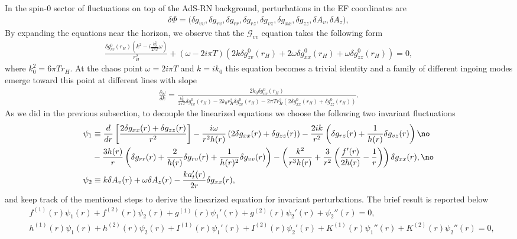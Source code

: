 \documentclass[preprintnumbers,aps,prd,longbibliography,nofootinbib,nobibnotes,amsmath,amssymb]{revtex4}
\begin{document}
 In the spin-0 sector of fluctuations on top of  the AdS-RN background, perturbations in the EF coordinates are 
\begin{align}
\delta \Phi = \bigg(\delta g_{v v}, \delta g_{r v}, \delta g_{rr}, \delta g_{r z}, \delta g_{v z}, \delta g_{x x}, \delta g_{z z}, \delta A_{v}, \delta A_{z}\bigg),
\end{align}
By expanding the equations near the horizon, we observe that  the $\mathcal{G}_{v v}$ equation takes the following form
\begin{align}
\frac{\delta g^{0}_{r v}(r_H) \left(k^2- i \frac{k_0^2}{2 \pi T} \omega \right)}{r_H^2}+(\omega -2 i \pi  T) (2 k \delta g^{0}_{z v}(r_H)+2 \omega  \delta g^{0}_{x x}(r_H)+\omega  \delta g^{0}_{z z}(r_H)) = 0,
\end{align}
where $k_0^2 = 6 \pi T r_H$. At the chaos point $\omega = 2 i \pi T$ and $k = i k_0$ this equation becomes a trivial identity and a  family  of different ingoing modes emerge toward this point at different lines with slope
\begin{align}
\frac{\delta \omega}{\delta k} = \frac{2 k_0 \delta g_{v v}^{0}(r_H)}{\frac{k_0^2}{2 \pi T}\delta g_{v v}^{0}(r_H) - 2 k_0 r_H^2 \delta g_{z v}^{0}(r_H) - 2 \pi  T r_H^2 \left(2\delta g_{x x}^{0}(r_H) + \delta g_{z z}^{0}(r_H)\right)}.
\end{align}
As we did in the previous subsection, to decouple the linearized equations  we choose the following two invariant fluctuations
\begin{align}\label{eqrn}
\psi_1 &\equiv \frac{d}{dr}\left[\frac{2\delta g_{x x}(r)  + \delta g_{z z}(r)}{r^2}\right] - \frac{i \omega}{r^2 h(r)} \left(2\delta g_{x x}(r)  + \delta g_{z z}(r)\right) - \frac{2 i k}{r^2} \left(\delta g_{r z}(r) + \frac{1}{h(r)}\delta g_{v z}(r)\right)\no\\
& - \frac{3 h(r)}{r} \left(\delta g_{rr}(r) +  \frac{2}{h(r)}\delta g_{r v}(r) + \frac{1}{h(r)^2} \delta g_{v v}(r)\right) - \left(\frac{k^2}{r^3 h(r)} + \frac{3}{ r^2} \left(\frac{f'(r)}{2 h(r)}  -  \frac{1}{r} \right)\right) \delta g_{x x}(r) ,\no\\
\psi_2 &\equiv k \delta A_v(r) + \omega \delta A_z(r) - \frac{k a_t'(r)}{2 r} \delta g_{x x}(r),
\end{align} 
and keep track of the mentioned steps  to derive the linearized equation for invariant perturbations. The brief result  is reported below
\begin{align}\label{eqinvariantrn}
&f^{(1)}(r) \psi_1(r) + f^{(2)}(r) \psi_2(r)  +g^{(1)}(r) \psi_1'(r) +g^{(2)}(r) \psi_2'(r) +  \psi_2''(r) = 0,\\
&h^{(1)}(r) \psi_1(r) + h^{(2)}(r) \psi_2(r)  + I^{(1)}(r) \psi_1'(r) + I^{(2)}(r) \psi_2'(r) + K^{(1)}(r) \psi_1''(r) + K^{(2)}(r) \psi_2''(r)= 0,\nonumber
\end{align}  
\end{document}
